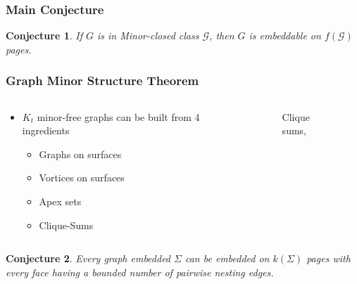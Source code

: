 \documentclass[english]{beamer}
\newtheorem{conjecture}{Conjecture}
\begin{document}
\begin{frame}
  \frametitle{Main Conjecture}
  \begin{conjecture}
    If $G$ is in Minor-closed class $\mathcal{G}$, then $G$ is embeddable on $f(\mathcal{G})$ pages.
  \end{conjecture}
\end{frame}

\begin{frame}
    \frametitle{Graph Minor Structure Theorem}
\begin{columns}
      \begin{column}{0.5\textwidth}
        \begin{itemize}
          \item $K_t$ minor-free graphs can be built from 4 ingredients \cite{robertsonGraphMinorsXVII1999} \begin{itemize}
            \item Graphs on surfaces
            \item Vortices on surfaces
            \item Apex sets
            \item Clique-Sums
          \end{itemize}
        \end{itemize}
      \end{column}
      \begin{column}{0.5\textwidth}
        \begin{figure}
          \centering
          
          \caption{Clique sums, \cite{eppsteinCliquesum2023}}
        \end{figure}
      \end{column}
\end{columns}
\end{frame}

\begin{frame}
  \begin{conjecture}
    Every graph embedded $\Sigma$ can be embedded on $k(\Sigma)$ pages with every face having a bounded number of pairwise nesting edges.
\end{conjecture}
\end{frame}

\begin{frame}[shrink = 50]
  
  \printbibliography
\end{frame}
\end{document}
